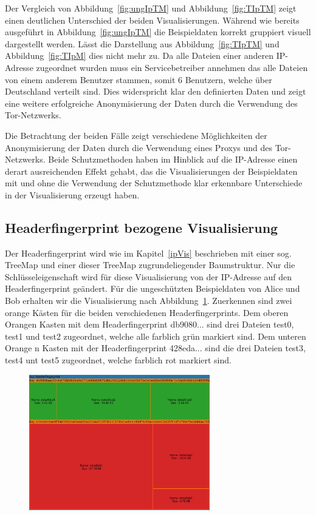 \documentclass[
    fontsize=12pt,
    headings=small,
    parskip=half,           %
    bibliography=totoc,
    numbers=noenddot,       %
    open=any,               %
    ]{scrreprt}
\begin{document}
Der Vergleich von Abbildung~\ref{fig:ungIpTM} und Abbildung~\ref{fig:TIpTM} zeigt einen deutlichen Unterschied der beiden Visualisierungen.
Während wie bereits ausgeführt in Abbildung~\ref{fig:ungIpTM} die Beispieldaten korrekt gruppiert visuell dargestellt werden. 
Lässt die Darstellung aus Abbildung~\ref{fig:TIpTM} und Abbildung~\ref{fig:TIpM} dies nicht mehr zu.
Da alle Dateien einer anderen IP-Adresse zugeordnet wurden muss ein Servicebetreiber annehmen das alle Dateien von einem anderem Benutzer stammen, somit 6 Benutzern, welche über Deutschland verteilt sind. 
Dies widerspricht klar den definierten Daten und zeigt eine weitere erfolgreiche Anonymisierung der Daten durch die Verwendung des Tor-Netzwerks.

Die Betrachtung der beiden Fälle zeigt verschiedene Möglichkeiten der Anonymisierung der Daten durch die Verwendung eines Proxys und des Tor-Netzwerks.
Beide Schutzmethoden haben im Hinblick auf die IP-Adresse einen derart ausreichenden Effekt gehabt, das die Visualisierungen der Beispieldaten mit und ohne die Verwendung der Schutzmethode klar erkennbare Unterschiede in der Visualisierung erzeugt haben.

    \subsection{Headerfingerprint bezogene Visualisierung}
Der Headerfingerprint wird wie im Kapitel~\ref{ipVis} beschrieben mit einer sog. TreeMap und einer dieser TreeMap zugrundeliegender Baumstruktur.
Nur die Schlüsseleigenschaft wird für diese Visualisierung von der IP-Adresse auf den Headerfingerprint geändert.
Für die ungeschützten Beispieldaten von Alice und Bob erhalten wir die Visualisierung nach Abbildung~\ref{fig:ungHTM}.
Zuerkennen sind zwei orange Kästen für die beiden verschiedenen Headerfingerprints.
Dem oberen Orangen Kasten mit dem Headerfingerprint db9080... sind drei Dateien test0, test1 und test2 zugeordnet, welche alle farblich grün markiert sind.
Dem unteren Orange n Kasten mit der Headerfingerprint 428eda... sind die drei Dateien test3, test4 unt test5 zugeordnet, welche farblich rot markiert sind.

\begin{figure}[H]
\includegraphics[width=0.7\textwidth]{../pic/Header-Proxy-SetA.png}
\label{fig:ungHTM}
\end{figure}
\end{document}

